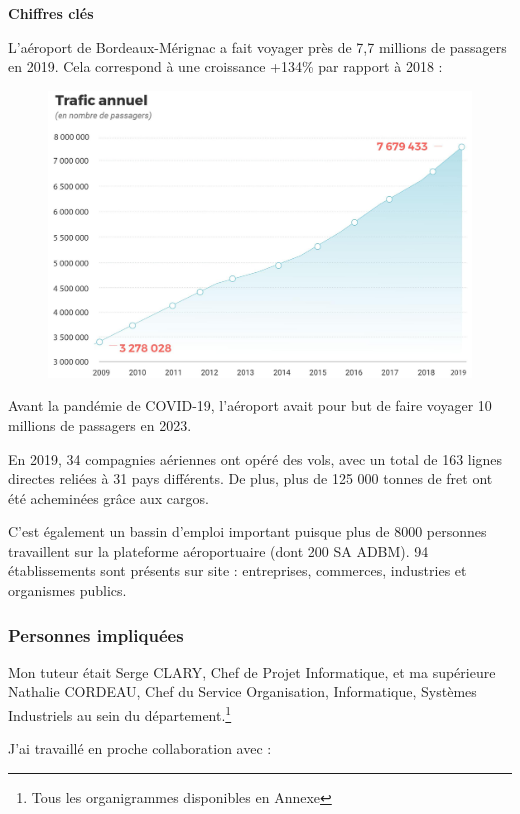 \newpage

\textbf{Chiffres clés}\newline

L'aéroport de Bordeaux-Mérignac a fait voyager près de 7,7 millions de passagers en 2019. Cela correspond à une croissance +134\% par rapport à 2018 :

\begin{figure}[hbt!]
    \centering
    \includegraphics[width=12cm]{Images/trafic.jpg}
    \label{fig:trafic}
\end{figure}

Avant la pandémie de COVID-19, l'aéroport avait pour but de faire voyager 10 millions de passagers en 2023.

En 2019, 34 compagnies aériennes ont opéré des vols, avec un total de 163 lignes directes reliées à 31 pays différents.
De plus, plus de 125 000 tonnes de fret ont été acheminées grâce aux cargos.

C'est également un bassin d'emploi important puisque plus de 8000 personnes travaillent sur la plateforme aéroportuaire (dont 200 SA ADBM).
94 établissements sont présents sur site : entreprises, commerces, industries et organismes publics.

\subsubsection*{Personnes impliquées}


Mon tuteur était Serge CLARY, Chef de Projet Informatique, et ma supérieure Nathalie CORDEAU, Chef du Service Organisation, Informatique, Systèmes Industriels au sein du département.\footnote{Tous les organigrammes disponibles en Annexe}

J'ai travaillé en proche collaboration avec :\newline

